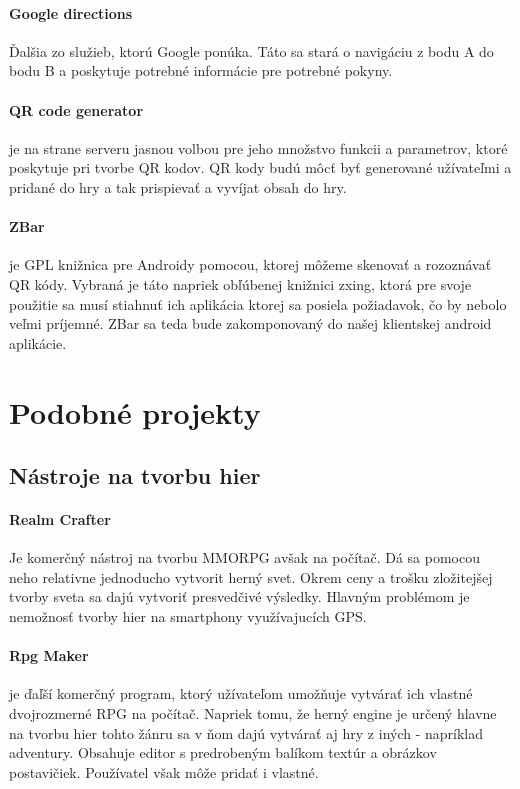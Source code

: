 \paragraph{Google directions} Ďalšia zo služieb, ktorú Google ponúka. Táto sa stará o navigáciu z bodu A do bodu B a poskytuje potrebné informácie pre potrebné pokyny.

\paragraph{QR code generator} je na strane serveru jasnou volbou pre jeho množstvo funkcii a parametrov\cite{qrgenerator-functions}, ktoré poskytuje pri tvorbe QR kodov. QR kody budú môcť byť generované užívateľmi a pridané do hry a tak prispievať a vyvíjat obsah do hry.



\paragraph{ZBar} je GPL knižnica pre Androidy pomocou, ktorej môžeme skenovať a rozoznávať QR kódy. Vybraná je táto napriek obľúbenej knižnici zxing, ktorá pre svoje použitie sa musí stiahnuť ich aplikácia ktorej sa posiela požiadavok, čo by nebolo veľmi príjemné. ZBar sa teda bude zakomponovaný do našej klientskej android aplikácie\cite{qrreader}.


\section{Podobné projekty}

\subsection{Nástroje na tvorbu hier}

\paragraph{Realm Crafter} Je komerčný nástroj na tvorbu MMORPG avšak na počítač. Dá sa pomocou neho relativne jednoducho vytvorit herný svet. Okrem ceny a trošku zložitejšej tvorby sveta sa dajú vytvoriť presvedčivé výsledky. Hlavným problémom je nemožnosť tvorby hier na smartphony využívajucích GPS.

\paragraph{Rpg Maker} je ďaľší komerčný program, ktorý užívateľom umožňuje vytvárať ich vlastné dvojrozmerné RPG na počítač. Napriek tomu, že herný engine je určený hlavne na tvorbu hier tohto žánru sa v ňom dajú vytvárať aj hry z iných - napríklad adventury\cite{rpg-maker-game}. Obsahuje editor s predrobeným balíkom textúr a obrázkov postavičiek. Používatel však môže pridať i vlastné. 
\cite{rpg-maker}

